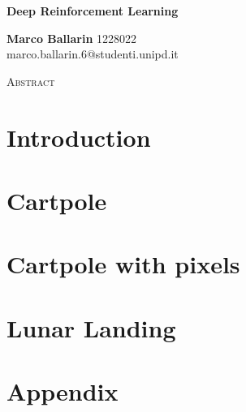 \documentclass{article}
\begin{document}
\begin{center}
    \huge
    \textbf{Deep Reinforcement Learning}  %
    
    \normalsize
    \vspace{0.4cm}
    \textbf{Marco Ballarin} 1228022  \\ %
    marco.ballarin.6@studenti.unipd.it

    \vspace{0.5cm}
    \Large
    \textsc{ Abstract}
    \begin{adjustwidth}{30pt}{30pt}
    \normalsize
    \vspace{0.3cm}
    
    \end{adjustwidth}
\end{center}
\vspace{0.2cm}

\section{Introduction \label{sec:int}}


\section{Cartpole \label{sec:cart}}


\section{Cartpole with pixels \label{sec:pixels}}


\section{Lunar Landing \label{sec:LunLand}}


\printbibliography

\newpage
\section{Appendix \label{sec:app}}


\end{document}
